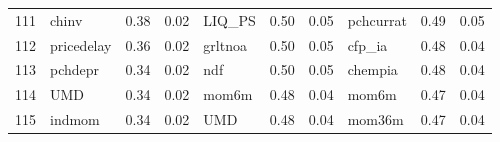 \documentclass[12pt]{article}
\begin{document}
\begin{landscape}
\begin{footnotesize}
\begin{longtable}{l|lcc|lcc|lcc}
			111                   & chinv                       & 0.38                                                                                 & 0.02                            & LIQ\_PS                     & 0.50                                                                                 & 0.05                            & pchcurrat                   & 0.49                                                                                 & 0.05                           \\
			112                   & pricedelay                  & 0.36                                                                                 & 0.02                            & grltnoa                     & 0.50                                                                                 & 0.05                            & cfp\_ia                     & 0.48                                                                                 & 0.04                           \\
			113                   & pchdepr                     & 0.34                                                                                 & 0.02                            & ndf                         & 0.50                                                                                 & 0.05                            & chempia                     & 0.48                                                                                 & 0.04                           \\
			114                   & UMD                         & 0.34                                                                                 & 0.02                            & mom6m                       & 0.48                                                                                 & 0.04                            & mom6m                       & 0.47                                                                                 & 0.04                           \\
			115                   & indmom                      & 0.34                                                                                 & 0.02                            & UMD                         & 0.48                                                                                 & 0.04                            & mom36m                      & 0.47                                                                                 & 0.04                           \\

\end{longtable}
\end{footnotesize}
\end{landscape}
\end{document}
